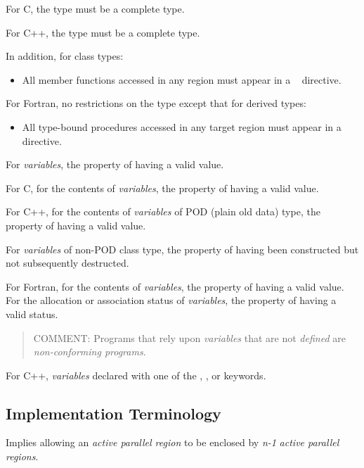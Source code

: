 For C, the type must be a complete type.

For C++, the type must be a complete type.

In addition, for class types:
\begin{itemize}
\item All member functions accessed in any  region must appear in a
~ directive.
\end{itemize}

For Fortran, no restrictions on the type except that for derived types:

\begin{itemize}
\item All type-bound procedures accessed in any target region must appear in a 
~ directive.
\end{itemize}
\glossarydefend

\glossarydefstart
For \emph{variables}, the property of having a valid value.

For C, for the contents of \emph{variables}, the property of having a valid 
value.

For C++, for the contents of \emph{variables} of POD (plain old data) type, 
the property of having a valid value.

For \emph{variables} of non-POD class type, the property of having been 
constructed but not subsequently destructed.

For Fortran, for the contents of \emph{variables}, the property of having 
a valid value. For the allocation or association status of \emph{variables}, 
the property of having a valid status.

\begin{quote}
COMMENT: Programs that rely upon \emph{variables} that are not \emph{defined} 
are \emph{non-conforming programs}.
\end{quote}
\glossarydefend

\glossarydefstart
For C++, \emph{variables} declared with one of the , , 
or  keywords.
\glossarydefend





\subsection{Implementation Terminology}
\label{subsec:Implementation Terminology}
\glossarydefstart
Implies allowing an \emph{active parallel region} to be enclosed by \emph{n-1} 
\emph{active parallel regions}.
\glossarydefend

